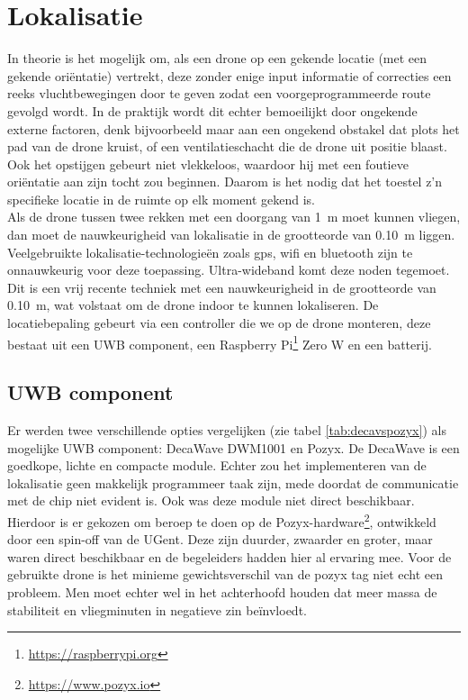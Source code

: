 \section{Lokalisatie} \label{sec:localization}
In theorie is het mogelijk om, als een drone op een gekende locatie (met een gekende oriëntatie) vertrekt, deze zonder enige input informatie of correcties een reeks vluchtbewegingen door te geven zodat een voorgeprogrammeerde route gevolgd wordt.
In de praktijk wordt dit echter bemoeilijkt door ongekende externe factoren, denk bijvoorbeeld maar aan een ongekend obstakel dat plots het pad van de drone kruist, of een ventilatieschacht die de drone uit positie blaast.
Ook het opstijgen gebeurt niet vlekkeloos, waardoor hij met een foutieve oriëntatie aan zijn tocht zou beginnen.
Daarom is het nodig dat het toestel z'n specifieke locatie in de ruimte op elk moment gekend is.\\

Als de drone tussen twee rekken met een doorgang van \SI{1}{\m} moet kunnen vliegen, dan moet de nauwkeurigheid van lokalisatie in de grootteorde van \SI{0.10}{\m} liggen.
Veelgebruikte lokalisatie-technologieën zoals gps, wifi en bluetooth zijn te onnauwkeurig voor deze toepassing.
Ultra-wideband komt deze noden tegemoet.
Dit is een vrij recente techniek met een nauwkeurigheid in de grootteorde van \SI{0.10}{\m}, wat volstaat om de drone indoor te kunnen lokaliseren.
De locatiebepaling gebeurt via een controller die we op de drone monteren, deze bestaat uit een UWB component, een Raspberry Pi\footnote{\url{https://raspberrypi.org}} Zero W en een batterij.\\

\subsection{UWB component} \label{sec:uwb}
Er werden twee verschillende opties vergelijken (zie tabel \ref{tab:decavspozyx}) als mogelijke UWB component: DecaWave DWM1001 en Pozyx.
De DecaWave is een goedkope, lichte en compacte module.
Echter zou het implementeren van de lokalisatie geen makkelijk programmeer taak zijn, mede doordat de communicatie met de chip niet evident is.
Ook was deze module niet direct beschikbaar. Hierdoor is er gekozen om beroep te doen op de Pozyx-hardware\footnote{\url{https://www.pozyx.io}}, ontwikkeld door een spin-off van de UGent. Deze zijn duurder, zwaarder en groter, maar waren direct beschikbaar en de begeleiders hadden hier al ervaring mee.
Voor de gebruikte drone is het minieme gewichtsverschil van de pozyx tag niet echt een probleem.
Men moet echter wel in het achterhoofd houden dat meer massa de stabiliteit en vliegminuten in negatieve zin beïnvloedt.\\

